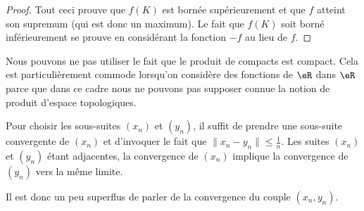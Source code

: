 \begin{proof}
	Tout ceci prouve que $f(K)$ est bornée supérieurement et que $f$ atteint son supremum (qui est donc un maximum). Le fait que $f(K)$ soit borné inférieurement se prouve en considérant la fonction $-f$ au lieu de $f$.

\end{proof}

\begin{remark}
    Nous pouvons ne pas utiliser le fait que le produit de compacts est compact. Cela est particulièrement commode lorsqu'on considère des fonctions de \( \eR\) dans \( \eR\) parce que dans ce cadre nous ne pouvons pas supposer connue la notion de produit d'espace topologiques.

    Pour choisir les sous-suites \( (x_n)\) et \( (y_n)\), il suffit de prendre une sous-suite convergente de \( (x_n)\) et d'invoquer le fait que \( \| x_n-y_n \|\leq \frac{1}{ n }\). Les suites \( (x_n)\) et \( (y_n)\) étant adjacentes, la convergence de \( (x_n)\) implique la convergence de \( (y_n)\) vers la même limite.

    Il est donc un peu superflus de parler de la convergence du couple \( (x_n,y_n)\).
\end{remark}
